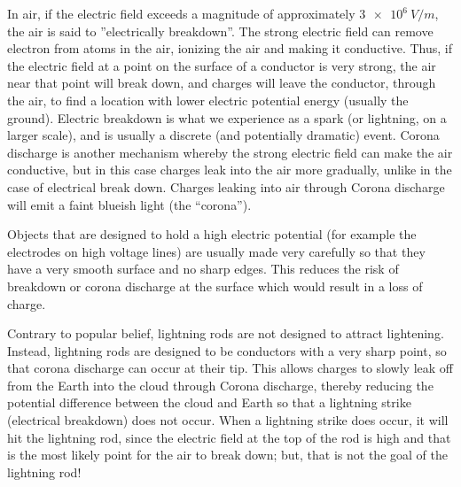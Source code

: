 In air, if the electric field exceeds a magnitude of approximately $\SI{3e6}{V/m}$, the air is said to ''electrically breakdown''. The strong electric field can remove electron from atoms in the air, ionizing the air and making it conductive. Thus, if the electric field at a point on the surface of a conductor is very strong, the air near that point will break down, and charges will leave the conductor, through the air, to find a location with lower electric potential energy (usually the ground). Electric breakdown is what we experience as a spark (or lightning, on a larger scale), and is usually a discrete (and potentially dramatic) event. Corona discharge is another mechanism whereby the strong electric field can make the air conductive, but in this case charges leak into the air more gradually, unlike in the case of electrical break down. Charges leaking into air through Corona discharge will emit a faint blueish light (the ``corona''). 

Objects that are designed to hold a high electric potential (for example the electrodes on high voltage lines) are usually made very carefully so that they have a very smooth surface and no sharp edges. This reduces the risk of breakdown or corona discharge at the surface which would result in a loss of charge.

Contrary to popular belief, lightning rods are not designed to attract lightening. Instead, lightning rods are designed to be conductors with a very sharp point, so that corona discharge can occur at their tip. This allows charges to slowly leak off from the Earth into the cloud through Corona discharge, thereby reducing the potential difference between the cloud and Earth so that a lightning strike (electrical breakdown) does not occur. When a lightning strike does occur, it will hit the lightning rod, since the electric field at the top of the rod is high and that is the most likely point for the air to break down; but, that is not the goal of the lightning rod!
